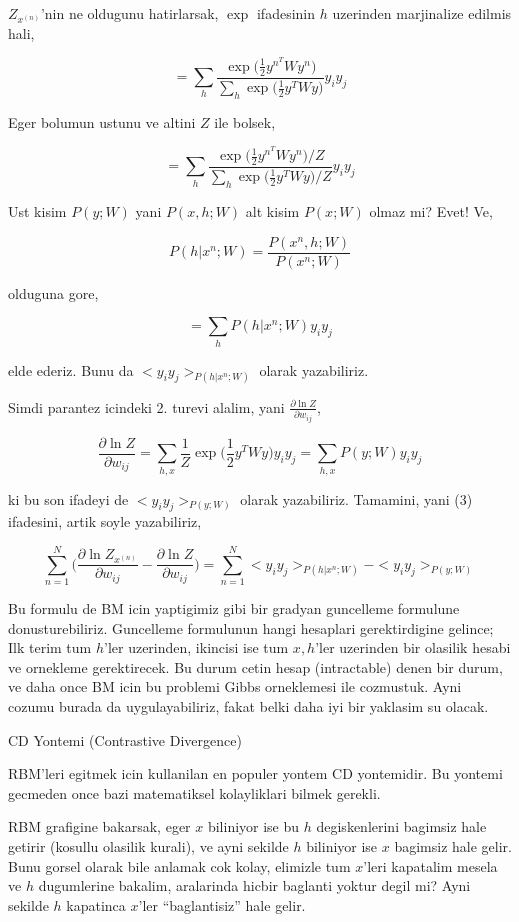 \documentclass[12pt,fleqn]{article}\usepackage{../common}
\begin{document}
$Z_{x^{(n)}}$'nin ne oldugunu hatirlarsak, $\exp$ ifadesinin $h$ uzerinden
marjinalize edilmis hali,

$$ 
= \sum_h  \frac{\exp \big( \frac{1}{2} y^{n^T} W y^n  \big)}
{\sum_h \exp \big( \frac{1}{2} y^T W y \big) } 
y_iy_j
$$

Eger bolumun ustunu ve altini $Z$ ile bolsek,

$$ 
= \sum_h  
\frac{\exp \big( \frac{1}{2} y^{n^T} W y^n  \big) / Z} 
{\sum_h \exp \big( \frac{1}{2} y^T W y \big) / Z} 
y_iy_j
$$

Ust kisim $P(y;W)$ yani $P(x,h;W) $ alt kisim $P(x;W)$ olmaz mi? Evet! Ve,


$$ P(h|x^n;W) = \frac{P(x^n,h;W)}{P(x^n;W)}  $$

olduguna gore, 

$$ =  \sum_h P(h|x^n;W) y_iy_j $$

elde ederiz. Bunu da $<y_iy_j>_{P(h|x^n;W)}$ olarak yazabiliriz. 

Simdi parantez icindeki 2. turevi alalim, yani $\frac{\partial \ln Z }{\partial w_{ij}} $,

$$ 
\frac{\partial \ln Z }{\partial w_{ij}}  = 
\sum_{h,x} \frac{1}{Z}  \exp \big( \frac{1}{2} y^{T} W y  \big) y_iy_j =
\sum_{h,x} P(y;W)  y_iy_j
$$

ki bu son ifadeyi de $<y_iy_j>_{P(y;W)}$ olarak yazabiliriz. Tamamini,
yani (3) ifadesini, artik soyle yazabiliriz,

$$
\sum_{n=1}^{N}  \big( \frac{\partial \ln Z_{x^{(n)}} }{\partial w_{ij}} - \frac{\partial \ln Z }{\partial w_{ij}} \big)
= \sum_{n=1}^{N}  <y_iy_j>_{P(h|x^n;W)} - <y_iy_j>_{P(y;W)}
$$

Bu formulu de BM icin yaptigimiz gibi bir gradyan guncelleme formulune
donusturebiliriz. Guncelleme formulunun hangi hesaplari gerektirdigine
gelince; Ilk terim tum $h$'ler uzerinden, ikincisi ise tum $x,h$'ler
uzerinden bir olasilik hesabi ve ornekleme gerektirecek. Bu durum cetin
hesap (intractable) denen bir durum, ve daha once BM icin bu problemi Gibbs
orneklemesi ile cozmustuk. Ayni cozumu burada da uygulayabiliriz, fakat
belki daha iyi bir yaklasim su olacak. 

CD Yontemi (Contrastive Divergence) 

RBM'leri egitmek icin kullanilan en populer yontem CD yontemidir. Bu
yontemi gecmeden once bazi matematiksel kolayliklari bilmek gerekli. 

RBM grafigine bakarsak, eger $x$ biliniyor ise bu $h$ degiskenlerini
bagimsiz hale getirir (kosullu olasilik kurali), ve ayni sekilde $h$
biliniyor ise $x$ bagimsiz hale gelir. Bunu gorsel olarak bile anlamak cok
kolay, elimizle tum $x$'leri kapatalim mesela ve $h$ dugumlerine bakalim,
aralarinda hicbir baglanti yoktur degil mi? Ayni sekilde $h$ kapatinca
$x$'ler ``baglantisiz'' hale gelir. 
\end{document}
